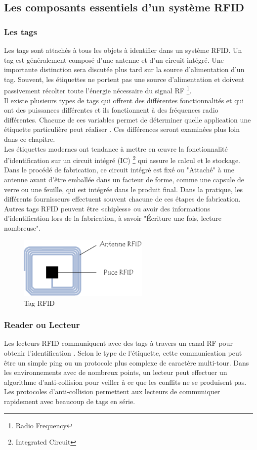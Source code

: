 \documentclass[11pt, a4paper, twoside]{book}
\begin{document}
\subsection{Les composants essentiels d'un système RFID}
\subsubsection{Les tags}
Les tags sont attachés à tous les objets à identifier dans un système RFID. Un tag est généralement
composé d'une antenne et d'un circuit intégré. Une importante
distinction sera discutée plus tard sur la source d'alimentation d'un tag. Souvent, les étiquettes ne portent pas une source d'alimentation et doivent passivement récolter toute l'énergie nécessaire du signal RF \footnote{Radio Frequency}.\\

Il existe plusieurs types de tags qui offrent des différentes fonctionnalités et qui ont des puissances différentes
et ils fonctionnent à des fréquences radio différentes. Chacune de ces variables permet de déterminer
quelle application une étiquette particulière peut réaliser . Ces différences seront examinées plus loin dans ce chapitre.\\

Les étiquettes modernes ont tendance à mettre en œuvre la fonctionnalité d'identification sur un circuit intégré (IC) \footnote{Integrated Circuit} qui
assure le calcul et le stockage. Dans le procédé de fabrication, ce circuit intégré est fixé ou
"Attaché" à une antenne avant d'être emballée dans un facteur de forme, comme une capsule de verre ou une feuille, qui est intégrée dans le produit final. Dans la pratique, les différents fournisseurs effectuent souvent chacune de ces étapes de fabrication. Autres tags RFID peuvent être «chipless» ou avoir des informations d'identification lors de la fabrication, à savoir
"Écriture une fois, lecture nombreuse". \\
\begin{figure}[H]
\centering
\includegraphics[height=3cm]{tag}
\caption{Tag RFID}
\end{figure}
\subsubsection{Reader ou Lecteur}
Les lecteurs RFID communiquent avec des tags à travers un canal RF pour obtenir l'identification
. Selon le type de l'étiquette, cette communication peut être un simple ping ou un protocole plus complexe de caractère multi-tour. Dans les environnements avec de nombreux points, un lecteur peut effectuer un algorithme d'anti-collision pour veiller à ce que les conflits ne se produisent pas. Les protocoles d'anti-collision permettent aux lecteurs de communiquer rapidement avec beaucoup de tags en série.\\
\end{document}
